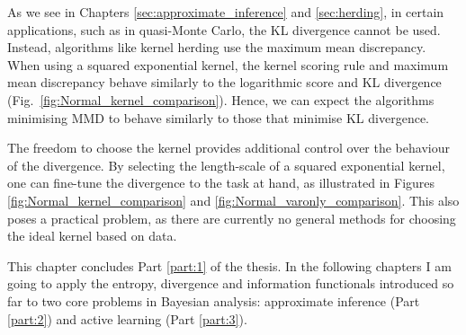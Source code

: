As we see in Chapters \ref{sec:approximate_inference} and \ref{sec:herding}, in certain applications, such as in quasi-Monte Carlo, the KL divergence cannot be used. Instead, algorithms like kernel herding use the maximum mean discrepancy. When using a squared exponential kernel, the kernel scoring rule and maximum mean discrepancy behave similarly to the logarithmic score and KL divergence (Fig.\ \ref{fig:Normal_kernel_comparison}). Hence, we can expect the algorithms minimising MMD to behave similarly to those that minimise KL divergence.

The freedom to choose the kernel provides additional control over the behaviour of the divergence. By selecting the length-scale of a squared exponential kernel, one can fine-tune the divergence to the task at hand, as illustrated in Figures \ref{fig:Normal_kernel_comparison} and \ref{fig:Normal_varonly_comparison}. This also poses a practical problem, as there are currently no general methods for choosing the ideal kernel based on data.

This chapter concludes Part \ref{part:1} of the thesis. In the following chapters I am going to apply the entropy, divergence and information functionals introduced so far to two core problems in Bayesian analysis: approximate inference (Part \ref{part:2}) and active learning (Part \ref{part:3}).